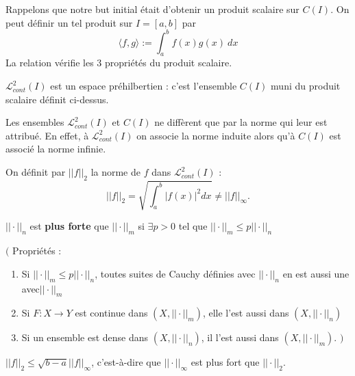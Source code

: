 Rappelons que notre but initial était d'obtenir un produit scalaire sur $C(I)$. On peut définir un tel produit sur $I=[a,b]$ par
\begin{equation*}
    \langle f,g \rangle := \int_a^b f(x)g(x)\ dx
\end{equation*}
La relation vérifie les 3 propriétés du produit scalaire.

\begin{definition}
    $\mathcal{L}_{cont}^2(I)$ est un espace préhilbertien : c'est l'ensemble $C(I)$ muni du produit scalaire définit ci-dessus.
\end{definition}

\begin{remark}
    Les ensembles $\mathcal{L}_{cont}^2(I)$ et $C(I)$ ne diffèrent que par la norme qui leur est attribué. En effet, à $\mathcal{L}_{cont}^2(I)$ on associe la norme induite alors qu'à $C(I)$ est associé la norme infinie.
\end{remark}

\begin{definition}
    On définit par $||f||_2$ la norme de $f$ dans $\mathcal{L}_{cont}^2(I)$ :
    \begin{equation*}
        ||f||_2 = \sqrt{\int_a^b |f(x)|^2 dx} \neq ||f||_\infty.
    \end{equation*}
\end{definition}

\begin{definition}
    $||\cdot||_n$ est \textbf{plus forte} que $||\cdot||_m$ si $\exists p>0$ tel que $||\cdot||_m\leq p||\cdot||_n$
\end{definition}

$\bigg($ Propriétés :
\begin{enumerate}[label=(\roman*)]
    \item Si $||\cdot||_m \leq p||\cdot||_n$, toutes suites de Cauchy définies avec $||\cdot||_n$ en est aussi une avec$||\cdot||_m$
    \item Si $F:X \rightarrow Y$ est continue dans $(X,||\cdot||_m)$, elle l'est aussi dans $(X,||\cdot||_n)$
    \item Si un ensemble est dense dans $(X,||\cdot||_n)$, il l'est aussi dans $(X,||\cdot||_m)$. $\bigg)$
\end{enumerate}

\begin{remark}
    $||f||_2\leq\sqrt{b-a}||f||_\infty$, c'est-à-dire que $||\cdot||_\infty$ est plus fort que $||\cdot||_2$.
\end{remark}

